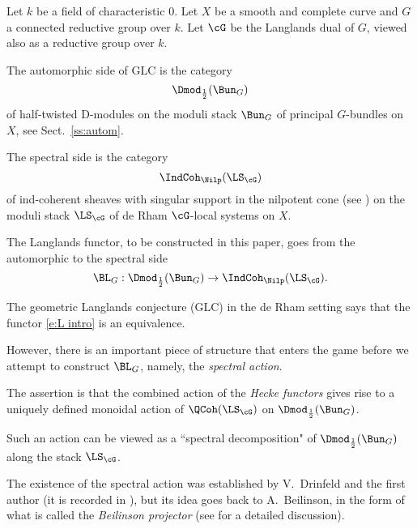 \documentclass[9pt]{amsart}
\theoremstyle{remark}
\theoremstyle{definition}
\theoremstyle{remark}
\newcommand{\secref}[1]{Sect.~\ref{#1}}
\numberwithin{equation}{section}
\begin{document}
\sssec{}

Let $k$ be a field of characteristic $0$. 
Let $X$ be a smooth and complete curve and $G$ a 
connected reductive group over $k$. Let $\cG$ be the Langlands dual of $G$, viewed also as a reductive group over $k$.

\medskip

The automorphic side of GLC is the category 
$$\Dmod_{\frac{1}{2}}(\Bun_G)$$
of half-twisted D-modules on the moduli stack $\Bun_G$ of principal $G$-bundles on $X$,
see \secref{ss:autom}.

\medskip

The spectral side is the category $$\IndCoh_\Nilp(\LS_\cG)$$ of ind-coherent sheaves with singular
support in the nilpotent cone (see \cite[Sect. 11.1.5]{AG}) on the moduli stack $\LS_\cG$ of
de Rham $\cG$-local systems on $X$.

\sssec{}

The Langlands functor, to be constructed in this paper, goes from the automorphic to the spectral side
\begin{equation} \label{e:L intro}
\BL_G:\Dmod_{\frac{1}{2}}(\Bun_G)\to \IndCoh_\Nilp(\LS_\cG). 
\end{equation} 

The geometric Langlands conjecture (GLC) in the de Rham setting says that the functor \eqref{e:L intro}
is an equivalence. 

\sssec{}

However, there is an important piece of structure that enters the game before we attempt to construct
$\BL_G$, namely, the \emph{spectral action}.

\medskip

The assertion is that the combined action of the \emph{Hecke functors} gives rise
to a uniquely defined monoidal action of $\QCoh(\LS_\cG)$ on $\Dmod_{\frac{1}{2}}(\Bun_G)$. 

\medskip

Such an action can be viewed as a ``spectral decomposition" of $\Dmod_{\frac{1}{2}}(\Bun_G)$
along the stack $\LS_\cG$. 

\medskip 

The existence of the spectral action was established by V.~Drinfeld and the first author (it is recorded 
in \cite[Corollary 4.5.5]{Ga2}), but its idea goes back to A.~Beilinson, in the form of what is called the
\emph{Beilinson projector} (see \cite[Sect. 15]{AGKRRV} for a detailed discussion).  

\sssec{}
\end{document}
